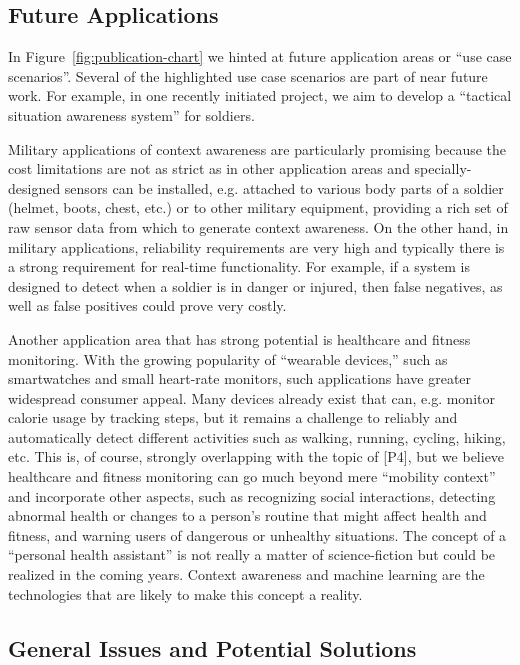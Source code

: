 \subsection{Future Applications}
\label{sec:future_applications}

In Figure~\ref{fig:publication-chart} we hinted at future application areas or ``use case scenarios''. Several of the highlighted use case scenarios are part of near future work. For example, in one recently initiated project, we aim to develop a ``tactical situation awareness system'' for soldiers.

Military applications of context awareness are particularly promising because the cost limitations are not as strict as in other application areas and specially-designed sensors can be installed, e.g. attached to various body parts of a soldier (helmet, boots, chest, etc.) or to other military equipment, providing a rich set of raw sensor data from which to generate context awareness. On the other hand, in military applications, reliability requirements are very high and typically there is a strong requirement for real-time functionality. For example, if a system is designed to detect when a soldier is in danger or injured, then false negatives, as well as false positives could prove very costly.

Another application area that has strong potential is healthcare and fitness monitoring. With the growing popularity of ``wearable devices,'' such as smartwatches and small heart-rate monitors, such applications have greater widespread consumer appeal. Many devices already exist that can, e.g. monitor calorie usage by tracking steps, but it remains a challenge to reliably and automatically detect different activities such as walking, running, cycling, hiking, etc. This is, of course, strongly overlapping with the topic of [P4], but we believe healthcare and fitness monitoring can go much beyond mere ``mobility context'' and incorporate other aspects, such as recognizing social interactions, detecting abnormal health or changes to a person's routine that might affect health and fitness, and warning users of dangerous or unhealthy situations. The concept of a ``personal health assistant'' is not really a matter of science-fiction but could be realized in the coming years. Context awareness and machine learning are the technologies that are likely to make this concept a reality.

\subsection{General Issues and Potential Solutions}
\label{sec:general_issues}

